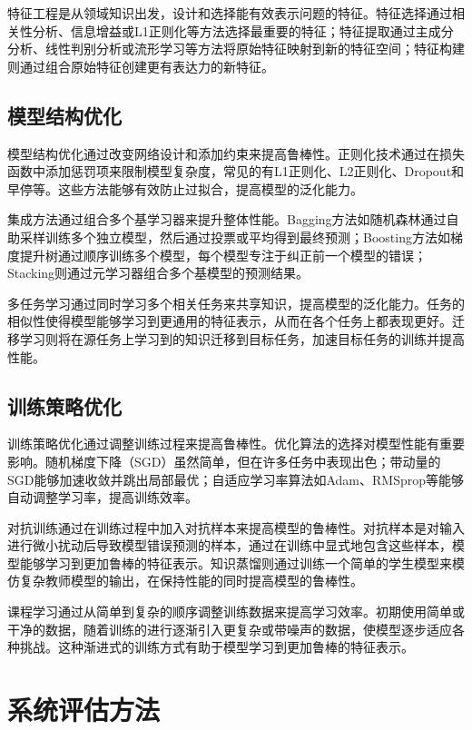 特征工程是从领域知识出发，设计和选择能有效表示问题的特征。特征选择通过相关性分析、信息增益或L1正则化等方法选择最重要的特征；特征提取通过主成分分析、线性判别分析或流形学习等方法将原始特征映射到新的特征空间；特征构建则通过组合原始特征创建更有表达力的新特征。

\subsection{模型结构优化}\label{sec:ch2-architecture}

模型结构优化通过改变网络设计和添加约束来提高鲁棒性。正则化技术通过在损失函数中添加惩罚项来限制模型复杂度，常见的有L1正则化、L2正则化、Dropout和早停等。这些方法能够有效防止过拟合，提高模型的泛化能力。

集成方法通过组合多个基学习器来提升整体性能。Bagging方法如随机森林通过自助采样训练多个独立模型，然后通过投票或平均得到最终预测；Boosting方法如梯度提升树通过顺序训练多个模型，每个模型专注于纠正前一个模型的错误；Stacking则通过元学习器组合多个基模型的预测结果。

多任务学习通过同时学习多个相关任务来共享知识，提高模型的泛化能力。任务的相似性使得模型能够学习到更通用的特征表示，从而在各个任务上都表现更好。迁移学习则将在源任务上学习到的知识迁移到目标任务，加速目标任务的训练并提高性能。

\subsection{训练策略优化}\label{sec:ch2-training}

训练策略优化通过调整训练过程来提高鲁棒性。优化算法的选择对模型性能有重要影响。随机梯度下降（SGD）虽然简单，但在许多任务中表现出色；带动量的SGD能够加速收敛并跳出局部最优；自适应学习率算法如Adam、RMSprop等能够自动调整学习率，提高训练效率。

对抗训练通过在训练过程中加入对抗样本来提高模型的鲁棒性。对抗样本是对输入进行微小扰动后导致模型错误预测的样本，通过在训练中显式地包含这些样本，模型能够学习到更加鲁棒的特征表示。知识蒸馏则通过训练一个简单的学生模型来模仿复杂教师模型的输出，在保持性能的同时提高模型的鲁棒性。

课程学习通过从简单到复杂的顺序调整训练数据来提高学习效率。初期使用简单或干净的数据，随着训练的进行逐渐引入更复杂或带噪声的数据，使模型逐步适应各种挑战。这种渐进式的训练方式有助于模型学习到更加鲁棒的特征表示。

\section{系统评估方法}\label{sec:ch2-evaluation}

